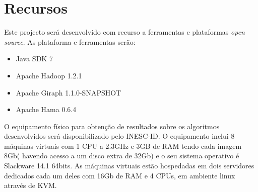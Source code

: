 \section{Recursos}
Este projecto será desenvolvido com recurso a ferramentas e plataformas \textit{open source}.
As plataforma e ferramentas serão:
\begin{itemize}
 \item Java SDK 7
 \item Apache Hadoop 1.2.1
 \item Apache Giraph 1.1.0-SNAPSHOT
 \item Apache Hama 0.6.4
\end{itemize}

O equipamento físico para obtenção de resultados sobre os algoritmos desenvolvidos será disponibilizado pelo INESC-ID. 
O equipamento inclui 8 máquinas virtuais com 1 CPU a 2.3GHz e 3GB de RAM tendo cada imagem 8Gb( havendo acesso a um disco extra de 32Gb) e o seu sistema operativo é Slackware 14.1 64bits.
As máquinas virtuais estão hospedadas em dois servidores dedicados cada um deles com 16Gb de RAM e 4 CPUs, em ambiente linux através de KVM.

